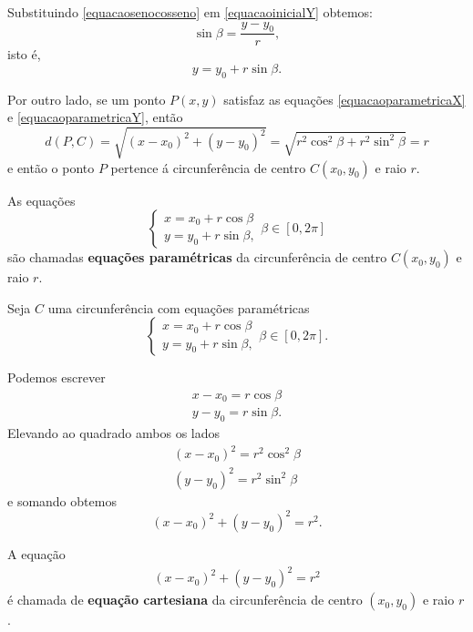 Substituindo \eqref{equacaosenocosseno} em \eqref{equacaoinicialY} obtemos:
\[
    \sin\beta = \dfrac{y - y_0}{r},
\]
isto é,
\begin{equation}\label{equacaoparametricaY}
    y = y_0 + r\sin\beta.
\end{equation}

Por outro lado, se um ponto $P(x, y)$ satisfaz as equações \eqref{equacaoparametricaX} e \eqref{equacaoparametricaY}, então
\[
    d(P,C) = \sqrt{(x - x_0)^2 + (y - y_0)^2} = \sqrt{r^2\cos^2\beta + r^2\sin^2\beta} = r
\]
e então o ponto $P$ pertence á circunferência de centro $C(x_0,y_0)$ e raio $r$.

\begin{definicao}
    As equações
    \[
        \begin{cases}
            x = x_0 + r\cos\beta \\
            y = y_0 + r\sin\beta,
        \end{cases}
        \beta \in [0,2\pi]
    \]
    são chamadas \textbf{equações paramétricas} da circunferência de centro $C(x_0, y_0)$ e raio $r$.
\end{definicao}

Seja $C$ uma circunferência com equações paramétricas
\[
    \begin{cases}
        x = x_0 + r\cos\beta \\
        y = y_0 + r\sin\beta,
    \end{cases}
    \beta \in [0,2\pi].
\]

Podemos escrever
\begin{align*}
    x - x_0 = r\cos\beta \\
    y - y_0 = r\sin\beta.
\end{align*}
Elevando ao quadrado ambos os lados
\begin{align*}
    (x - x_0)^2 = r^2\cos^2\beta \\
    (y - y_0)^2 = r^2\sin^2\beta
\end{align*}
e somando obtemos
\begin{equation}
    (x - x_0)^2 + (y - y_0)^2 = r^2.
\end{equation}

\begin{definicao}
    A equação
    \begin{align}\label{equacao_cartesiana_da_circunferencia}
        (x - x_0)^2 + (y - y_0)^2 = r^2
    \end{align}
    é chamada de \textbf{equação cartesiana} da circunferência de centro $(x_0,y_0)$ e raio $r$.
\end{definicao}

